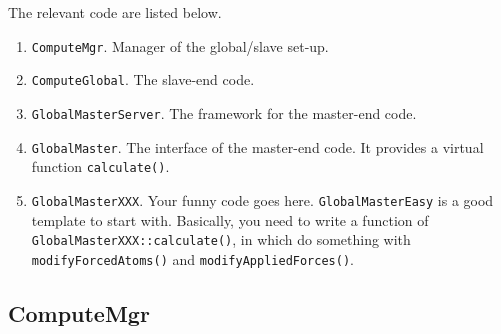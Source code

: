 \documentclass{article}
\begin{document}
The relevant code are listed below.
\begin{enumerate}
  \item \texttt{ComputeMgr}. Manager of the global/slave set-up.

  \item \texttt{ComputeGlobal}.  The slave-end code.

  \item \texttt{GlobalMasterServer}. The framework for the master-end code.

  \item \texttt{GlobalMaster}.  The interface of the master-end code.
    It provides a virtual function \texttt{calculate()}.

  \item \texttt{GlobalMasterXXX}. Your funny code goes here.
    \texttt{GlobalMasterEasy} is a good template to start with.
    Basically, you need to write a function of
    \texttt{GlobalMasterXXX::calculate()},
    in which do something with
    \texttt{modifyForcedAtoms()}
    and \texttt{modifyAppliedForces()}.
\end{enumerate}


\subsection{ComputeMgr}
\end{document}
